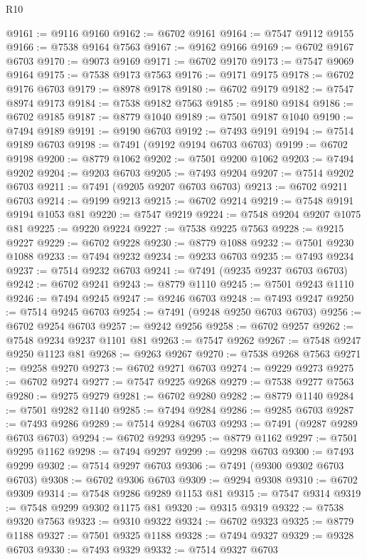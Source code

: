 \begin{lexlean}{R10}
\begin{coremodule}
@9161 := @9116 @9160
@9162 := @6702 @9161
@9164 := @7547 @9112 @9155
@9166 := @7538 @9164 @7563
@9167 := @9162 @9166
@9169 := @6702 @9167 @6703
@9170 := @9073 @9169
@9171 := @6702 @9170
@9173 := @7547 @9069 @9164
@9175 := @7538 @9173 @7563
@9176 := @9171 @9175
@9178 := @6702 @9176 @6703
@9179 := @8978 @9178
@9180 := @6702 @9179
@9182 := @7547 @8974 @9173
@9184 := @7538 @9182 @7563
@9185 := @9180 @9184
@9186 := @6702 @9185
@9187 := @8779 @1040
@9189 := @7501 @9187 @1040
@9190 := @7494 @9189
@9191 := @9190 @6703
@9192 := @7493 @9191
@9194 := @7514 @9189 @6703
@9198 := @7491 (@9192 @9194 @6703 @6703)
@9199 := @6702 @9198
@9200 := @8779 @1062
@9202 := @7501 @9200 @1062
@9203 := @7494 @9202
@9204 := @9203 @6703
@9205 := @7493 @9204
@9207 := @7514 @9202 @6703
@9211 := @7491 (@9205 @9207 @6703 @6703)
@9213 := @6702 @9211 @6703
@9214 := @9199 @9213
@9215 := @6702 @9214
@9219 := @7548 @9191 @9194 @1053 @81
@9220 := @7547 @9219
@9224 := @7548 @9204 @9207 @1075 @81
@9225 := @9220 @9224
@9227 := @7538 @9225 @7563
@9228 := @9215 @9227
@9229 := @6702 @9228
@9230 := @8779 @1088
@9232 := @7501 @9230 @1088
@9233 := @7494 @9232
@9234 := @9233 @6703
@9235 := @7493 @9234
@9237 := @7514 @9232 @6703
@9241 := @7491 (@9235 @9237 @6703 @6703)
@9242 := @6702 @9241
@9243 := @8779 @1110
@9245 := @7501 @9243 @1110
@9246 := @7494 @9245
@9247 := @9246 @6703
@9248 := @7493 @9247
@9250 := @7514 @9245 @6703
@9254 := @7491 (@9248 @9250 @6703 @6703)
@9256 := @6702 @9254 @6703
@9257 := @9242 @9256
@9258 := @6702 @9257
@9262 := @7548 @9234 @9237 @1101 @81
@9263 := @7547 @9262
@9267 := @7548 @9247 @9250 @1123 @81
@9268 := @9263 @9267
@9270 := @7538 @9268 @7563
@9271 := @9258 @9270
@9273 := @6702 @9271 @6703
@9274 := @9229 @9273
@9275 := @6702 @9274
@9277 := @7547 @9225 @9268
@9279 := @7538 @9277 @7563
@9280 := @9275 @9279
@9281 := @6702 @9280
@9282 := @8779 @1140
@9284 := @7501 @9282 @1140
@9285 := @7494 @9284
@9286 := @9285 @6703
@9287 := @7493 @9286
@9289 := @7514 @9284 @6703
@9293 := @7491 (@9287 @9289 @6703 @6703)
@9294 := @6702 @9293
@9295 := @8779 @1162
@9297 := @7501 @9295 @1162
@9298 := @7494 @9297
@9299 := @9298 @6703
@9300 := @7493 @9299
@9302 := @7514 @9297 @6703
@9306 := @7491 (@9300 @9302 @6703 @6703)
@9308 := @6702 @9306 @6703
@9309 := @9294 @9308
@9310 := @6702 @9309
@9314 := @7548 @9286 @9289 @1153 @81
@9315 := @7547 @9314
@9319 := @7548 @9299 @9302 @1175 @81
@9320 := @9315 @9319
@9322 := @7538 @9320 @7563
@9323 := @9310 @9322
@9324 := @6702 @9323
@9325 := @8779 @1188
@9327 := @7501 @9325 @1188
@9328 := @7494 @9327
@9329 := @9328 @6703
@9330 := @7493 @9329
@9332 := @7514 @9327 @6703

\end{coremodule}
\end{lexlean}
